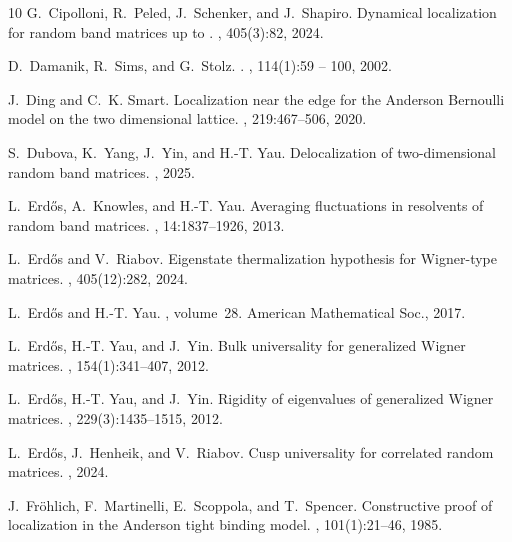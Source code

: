 \documentclass[10pt,reqno]{amsart}
\numberwithin{equation}{section}
\numberwithin{figure}{section}
\theoremstyle{plain} %
\theoremstyle{definition} %
\numberwithin{equation}{section}
\begin{document}
\begin{thebibliography}{10}
	G.~Cipolloni, R.~Peled, J.~Schenker, and J.~Shapiro.
	\newblock Dynamical localization for random band matrices up to .
	, 405(3):82, 2024.
	
	D.~Damanik, R.~Sims, and G.~Stolz.
	.
	, 114(1):59 -- 100, 2002.
	
	J.~Ding and C.~K. Smart.
	\newblock Localization near the edge for the {Anderson Bernoulli} model on the
	two dimensional lattice.
	, 219:467--506, 2020.
	
	S.~Dubova, K.~Yang, J.~Yin, and H.-T. Yau.
	\newblock Delocalization of two-dimensional random band matrices.
	, 2025.
	
	L.~Erd{\H o}s, A.~Knowles, and H.-T. Yau.
	\newblock Averaging fluctuations in resolvents of random band matrices.
	, 14:1837--1926, 2013.
	
	L.~Erd{\H{o}}s and V.~Riabov.
	\newblock Eigenstate thermalization hypothesis for {Wigner}-type matrices.
	, 405(12):282, 2024.
	
	L.~Erd{\H{o}}s and H.-T. Yau.
	, volume~28.
	\newblock American Mathematical Soc., 2017.
	
	L.~Erd{\H{o}}s, H.-T. Yau, and J.~Yin.
	\newblock Bulk universality for generalized {W}igner matrices.
	, 154(1):341--407, 2012.
	
	L.~Erd{\H{o}}s, H.-T. Yau, and J.~Yin.
	\newblock Rigidity of eigenvalues of generalized {W}igner matrices.
	, 229(3):1435--1515, 2012.
	
	L.~Erdős, J.~Henheik, and V.~Riabov.
	\newblock Cusp universality for correlated random matrices.
	, 2024.
	
	J.~Fr{\"o}hlich, F.~Martinelli, E.~Scoppola, and T.~Spencer.
	\newblock Constructive proof of localization in the {Anderson} tight binding
	model.
	, 101(1):21--46, 1985.
	

\end{thebibliography}
\end{document}
